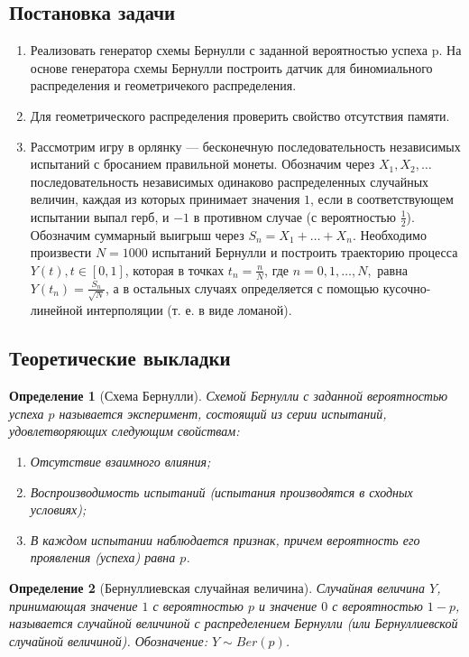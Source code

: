 \documentclass[11pt]{article}
\newtheorem{definition}{Определение}
\begin{document}
\subsection{Постановка задачи}
\begin{enumerate}
\item Реализовать генератор схемы Бернулли с заданной вероятностью успеха p. На основе генератора схемы Бернулли построить датчик для биномиального распределения и геометричекого распределения.
\item Для геометрического распределения проверить свойство отсутствия памяти.
\item Рассмотрим игру в орлянку — бесконечную последовательность независимых испытаний с бросанием правильной монеты. Обозначим через $X_1,X_2,\ldots$ последовательность независимых одинаково распределенных случайных величин, каждая из которых принимает значения $1$, если в соответствующем испытании выпал герб, и $-1$ в противном случае (с вероятностью $\tfrac{1}{2}$). Обозначим суммарный выигрыш через $S_n = X_1 + \ldots + X_n$. Необходимо произвести $N = 1000$ испытаний Бернулли и построить траекторию процесса $Y(t), t \in [0, 1]$, которая в точках $t_n = \tfrac{n}{N}$, где $n = 0, 1, \ldots, N,$ равна $Y(t_n) = \frac{S_n}{\sqrt{N}}$, а в остальных случаях определяется с помощью кусочно-линейной интерполяции (т. е. в виде ломаной).
\end{enumerate}
\subsection{Теоретические выкладки}
\begin{definition}[Схема Бернулли]
Схемой Бернулли с заданной вероятностью успеха $p$ называется эксперимент, состоящий из серии испытаний, удовлетворяющих следующим свойствам:
\begin{enumerate}
\item Отсутствие взаимного влияния;
\item Воспроизводимость испытаний (испытания производятся в сходных условиях);
\item В каждом испытании наблюдается признак, причем вероятность его проявления (успеха) равна $p$.
\end{enumerate}
\end{definition}
\begin{definition}[Бернуллиевская случайная величина]
Случайная величина $Y$, принимающая значение $1$ с вероятностью $p$ и значение $0$ с вероятностью $1-p$, называется случайной величиной с распределением Бернулли (или Бернуллиевской случайной величиной).
Обозначение: $Y \sim Ber(p)$.
\end{definition}
\end{document}
